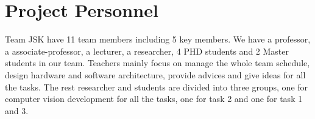 \documentclass{standalone}
\begin{document}
\section{Project Personnel}
Team JSK have 11 team members including 5 key members. We have a professor, a associate-professor, a lecturer, a researcher, 4 PHD students and 2 Master students in our team. Teachers mainly focus on manage the whole team schedule, design hardware and software architecture, provide advices and give ideas for all the tasks. The rest researcher and students are divided into three groups, one for computer vision development for all the tasks, one for task 2 and one for task 1 and 3.
\end{document}
